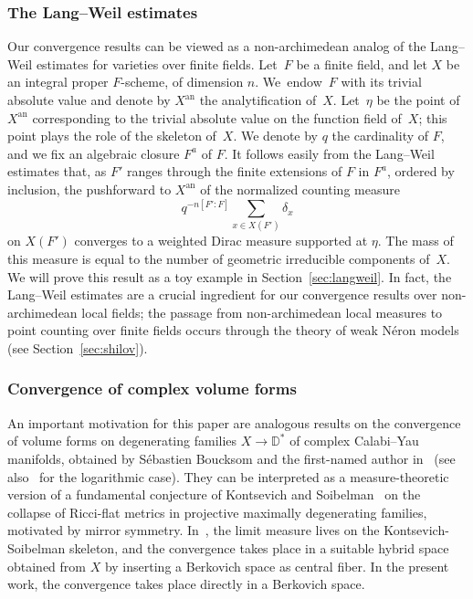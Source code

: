 \documentclass[JEP,XML,SOM,Unicode,NoFloatCountersInSection]{cedram}
\theoremstyle{definition}
\numberwithin{equation}{subsection}
\newcommand{\an}{\mathrm{an}}
\begin{document}
\subsubsection*{The Lang--Weil estimates}
Our convergence results can be viewed as a non-archimedean analog of the Lang--Weil estimates
for varieties over finite fields. Let~$F$ be a finite field, and let $X$ be an integral proper $F$-scheme, of dimension $n$. We~endow~$F$ with its trivial absolute value and denote by $X^{\an}$ the analytification of~$X$. Let~$\eta$ be the point of $X^{\an}$ corresponding to the trivial absolute value on the function field of~$X$; this point plays the role of the skeleton of~$X$.
We denote by $q$ the cardinality of $F$, and we fix an algebraic closure $F^a$ of $F$. It follows easily from the Lang--Weil estimates that, as $F'$ ranges through the finite extensions of $F$ in $F^a$, ordered by inclusion, the pushforward to $X^{\an}$ of the normalized counting measure
\[
q^{-n[F'\colon F]}\sum_{x\in X(F')}\delta_x
\]
on $X(F')$ converges to a weighted Dirac measure supported at $\eta$. The mass of this measure
is equal to the number of geometric irreducible components of~$X$. We will prove this result as a toy example in Section~\ref{sec:langweil}. In fact, the Lang--Weil estimates are a crucial ingredient for our convergence results over non-archimedean local fields; the passage from non-archimedean local measures to point counting over finite fields occurs through the theory of weak Néron models (see Section~\ref{sec:shilov}).

\subsubsection*{Convergence of complex volume forms}
An important motivation for this paper are analogous results on the convergence of volume forms on degenerating families $X\to\mathbb{D}^*$ of complex Calabi--Yau manifolds, obtained by Sébastien Boucksom and the first-named author in~\cite{BJ} (see also~\cite{Sh19} for the logarithmic case). They can be interpreted as a measure-theoretic version of a fundamental conjecture of Kontsevich and Soibelman~\cite{KS} on the collapse of Ricci-flat metrics in projective maximally degenerating families, motivated by mirror symmetry. In~\cite{BJ}, the limit measure lives on the Kontsevich-Soibelman skeleton, and the convergence takes place in a suitable hybrid space obtained from $X$ by inserting a Berkovich space as central fiber.
In the present work, the convergence takes place directly in a Berkovich space.
\end{document}
